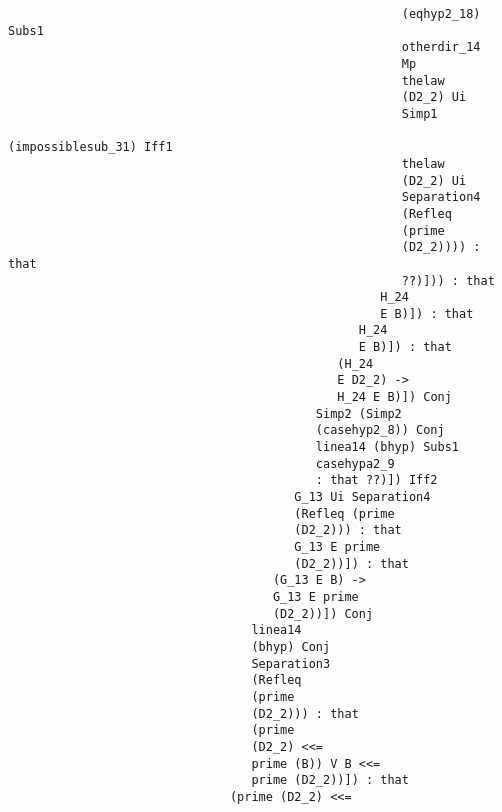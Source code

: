 \documentclass[12pt]{article}
\begin{document}
\begin{verbatim}
                                                       (eqhyp2_18) Subs1 
                                                       otherdir_14 
                                                       Mp 
                                                       thelaw 
                                                       (D2_2) Ui 
                                                       Simp1 
                                                       (impossiblesub_31) Iff1 
                                                       thelaw 
                                                       (D2_2) Ui 
                                                       Separation4 
                                                       (Refleq 
                                                       (prime 
                                                       (D2_2)))) : that 
                                                       ??)])) : that 
                                                    H_24 
                                                    E B)]) : that 
                                                 H_24 
                                                 E B)]) : that 
                                              (H_24 
                                              E D2_2) -> 
                                              H_24 E B)]) Conj 
                                           Simp2 (Simp2 
                                           (casehyp2_8)) Conj 
                                           linea14 (bhyp) Subs1 
                                           casehypa2_9 
                                           : that ??)]) Iff2 
                                        G_13 Ui Separation4 
                                        (Refleq (prime 
                                        (D2_2))) : that 
                                        G_13 E prime 
                                        (D2_2))]) : that 
                                     (G_13 E B) -> 
                                     G_13 E prime 
                                     (D2_2))]) Conj 
                                  linea14 
                                  (bhyp) Conj 
                                  Separation3 
                                  (Refleq 
                                  (prime 
                                  (D2_2))) : that 
                                  (prime 
                                  (D2_2) <<= 
                                  prime (B)) V B <<= 
                                  prime (D2_2))]) : that 
                               (prime (D2_2) <<= 

\end{verbatim}
\end{document}
